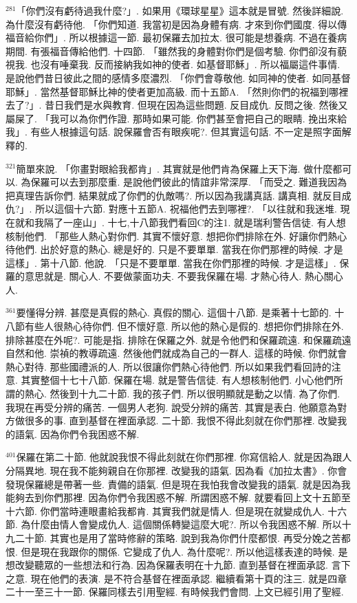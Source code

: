 \documentclass{book}
\begin{document}
$^{281}$「你們沒有虧待過我什麼?」.
如果用《環球星星》這本就是冒號.
然後詳細說.
為什麼沒有虧待他.
「你們知道.
我當初是因為身體有病.
才來到你們國度.
得以傳福音給你們」.
所以根據這一節.
最初保羅去加拉太.
很可能是想養病.
不過在養病期間.
有張福音傳給他們.
十四節.
「雖然我的身體對你們是個考驗.
你們卻沒有藐視我.
也沒有唾棄我.
反而接納我如神的使者.
如基督耶穌」.
所以福屬這件事情.
是說他們昔日彼此之間的感情多麼濃烈.
「你們會尊敬他.
如同神的使者.
如同基督耶穌」.
當然基督耶穌比神的使者更加高級.
而十五節A.
「然則你們的祝福到哪裡去了?」.
昔日我們是水與教育.
但現在因為這些問題.
反目成仇.
反問之後.
然後又屬屎了.
「我可以為你們作證.
那時如果可能.
你們甚至會把自己的眼睛.
挽出來給我」.
有些人根據這句話.
說保羅會否有眼疾呢?.
但其實這句話.
不一定是照字面解釋的.

$^{321}$簡單來說.
「你畫對眼給我都肯」.
其實就是他們肯為保羅上天下海.
做什麼都可以.
為保羅可以去到那麼重.
是說他們彼此的情誼非常深厚.
「而受之.
難道我因為把真理告訴你們.
結果就成了你們的仇敵嗎?.
所以因為我講真話.
講真相.
就反目成仇?」.
所以這個十六節.
對應十五節A.
祝福他們去到哪裡?.
「以往就和我迷堆.
現在就和我隔了一座山」.
十七,十八節我們看回C的注1.
就是瑞利警告信徒.
有人想核制他們.
「那些人熱心對你們.
其實不懷好意.
想把你們排除在外.
好讓你們熱心待他們.
出於好意的熱心.
總是好的.
只是不要單單.
當我在你們那裡的時候.
才是這樣」.
第十八節.
他說.
「只是不要單單.
當我在你們那裡的時候.
才是這樣」.
保羅的意思就是.
關心人.
不要做蒙面功夫.
不要我保羅在場.
才熱心待人.
熱心關心人.

$^{361}$要懂得分辨.
甚麼是真假的熱心.
真假的關心.
這個十八節.
是乘著十七節的.
十八節有些人很熱心待你們.
但不懷好意.
所以他的熱心是假的.
想把你們排除在外.
排除甚麼在外呢?.
可能是指.
排除在保羅之外.
就是令他們和保羅疏遠.
和保羅疏遠自然和他.
崇禎的教導疏遠.
然後他們就成為自己的一群人.
這樣的時候.
你們就會熱心對待.
那些國禮派的人.
所以很讓你們熱心待他們.
所以如果我們看回詩的注意.
其實整個十七十八節.
保羅在場.
就是警告信徒.
有人想核制他們.
小心他們所謂的熱心.
然後到十九二十節.
我的孩子們.
所以很明顯就是動之以情.
為了你們.
我現在再受分辨的痛苦.
一個男人老狗.
說受分辨的痛苦.
其實是表白.
他願意為對方做很多的事.
直到基督在裡面承認.
二十節.
我恨不得此刻就在你們那裡.
改變我的語氣.
因為你們令我困惑不解.

$^{401}$保羅在第二十節.
他就說我恨不得此刻就在你們那裡.
你寫信給人.
就是因為跟人分隔異地.
現在我不能夠親自在你那裡.
改變我的語氣.
因為看《加拉太書》.
你會發現保羅總是帶著一些.
責備的語氣.
但是現在我怕我會改變我的語氣.
就是因為我能夠去到你們那裡.
因為你們令我困惑不解.
所謂困惑不解.
就要看回上文十五節至十六節.
你們當時連眼畫給我都肯.
其實我們就是情人.
但是現在就變成仇人.
十六節.
為什麼由情人會變成仇人.
這個關係轉變這麼大呢?.
所以令我困惑不解.
所以十九二十節.
其實也是用了當時修辭的策略.
說到我為你們什麼都恨.
再受分娩之苦都恨.
但是現在我跟你的關係.
它變成了仇人.
為什麼呢?.
所以他這樣表達的時候.
是想改變聽眾的一些想法和行為.
因為保羅表明在十九節.
直到基督在裡面承認.
言下之意.
現在他們的表演.
是不符合基督在裡面承認.
繼續看第十頁的注三.
就是四章二十一至三十一節.
保羅同樣去引用聖經.
有時候我們會問.
上文已經引用了聖經.
\end{document}
